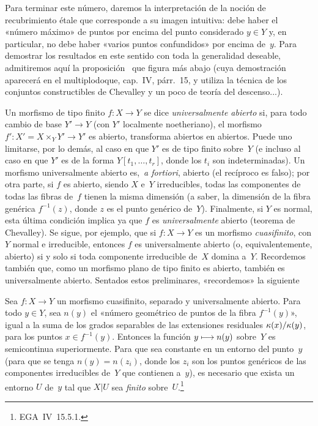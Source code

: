 Para terminar este número, daremos la interpretación de la noción de recubrimiento étale que corresponde a su imagen intuitiva: debe haber el «número máximo» de puntos por encima del punto considerado $y\in Y$ y, en particular, no debe haber «varios puntos confundidos» por encima de~$y$. Para demostrar los resultados en este sentido con toda la generalidad deseable, admitiremos aquí la proposición~ que figura más abajo (cuya demostración aparecerá en el multiplodoque, cap.~IV, párr.~15, y utiliza la técnica de los conjuntos constructibles de Chevalley y un poco de teoría del descenso...).

Un morfismo de tipo finito $f\colon X\to Y$ se dice \emph{universalmente abierto} si, para todo cambio de base $Y'\to Y$ (con $Y'$ localmente noetheriano), el morfismo $f'\colon X'=X\times_YY'\to Y'$ es abierto, \ie transforma abiertos en abiertos. Puede uno limitarse, por lo demás, al caso en que $Y'$ es de tipo finito sobre~$Y$ (e incluso al caso en que $Y'$ es de la forma $Y[t_1,\dots,t_r]$, donde los $t_i$ son indeterminadas). Un morfismo universalmente abierto es, \,\emph{a fortiori}, abierto (el recíproco es falso); por otra parte, si $f$ es abierto, siendo $X$ e~$Y$ irreducibles, todas las componentes de todas las fibras de~$f$ tienen la misma dimensión (a saber, la dimensión de la fibra genérica
$f^{-1}(z)$, donde $z$ es el punto genérico de~$Y$). Finalmente, si $Y$ es normal, esta última condición implica ya que $f$ es \emph{universalmente} abierto (teorema de Chevalley). Se sigue, por ejemplo, que si $f\colon X\to Y$ es un morfismo \emph{cuasifinito}, con $Y$ normal e irreducible, entonces $f$ es universalmente abierto (o, equivalentemente, abierto) si y solo si toda componente irreducible de~$X$ domina a~$Y$. Recordemos también que, como un morfismo plano de tipo finito es abierto, también es universalmente abierto. Sentados estos preliminares, «recordemos» la siguiente

\begin{proposition}
\label{I.10.7}
Sea $f\colon X\to Y$ un morfismo cuasifinito, separado y universalmente abierto. Para todo $y\in Y$, sea $n(y)$ el «número geométrico de puntos de la fibra $f^{-1}(y)$», igual a la suma de los grados separables de las extensiones residuales $\kappa(x)/\kappa(y)$, para los puntos $x\in f^{-1}(y)$. Entonces la función $y\longmapsto n(y)$ sobre~$Y$ es semicontinua superiormente. Para que sea constante en un entorno del punto~$y$ (\ie para que se tenga $n(y)=n(z_i)$, donde los $z_i$ son los puntos genéricos de las componentes irreducibles de~$Y$ que contienen a~$y$), es necesario que exista un entorno $U$ de~$y$ tal que $X|U$ sea \emph{finito} sobre~$U$.\footnote{\Cf EGA~IV~15.5.1.}
\end{proposition}

